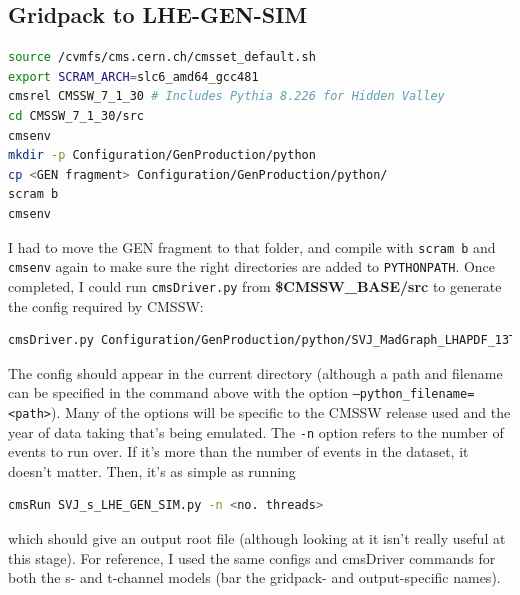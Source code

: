\subsection{Gridpack to LHE-GEN-SIM}

\begin{lstlisting}[belowskip=-0.7cm, language=sh, numbers=none]
source /cvmfs/cms.cern.ch/cmsset_default.sh
export SCRAM_ARCH=slc6_amd64_gcc481
cmsrel CMSSW_7_1_30 # Includes Pythia 8.226 for Hidden Valley
cd CMSSW_7_1_30/src
cmsenv
mkdir -p Configuration/GenProduction/python
cp <GEN fragment> Configuration/GenProduction/python/
scram b
cmsenv
\end{lstlisting}

I had to move the GEN fragment to that folder, and compile with \texttt{scram b} and \texttt{cmsenv} again to make sure the right directories are added to \texttt{PYTHONPATH}. Once completed, I could run \texttt{cmsDriver.py} from \textbf{\$CMSSW\_BASE/src} to generate the config required by CMSSW:

\begin{lstlisting}[belowskip=-0.7cm, language=sh, numbers=none]
cmsDriver.py Configuration/GenProduction/python/SVJ_MadGraph_LHAPDF_13TeV_s_channel_spin1_GEN_frag.py --fileout file:SVJ_s_LHE_GEN_SIM.root --mc --eventcontent RAWSIM,LHE --customise SLHCUpgradeSimulations/Configuration/postLS1Customs.customisePostLS1,Configuration/DataProcessing/Utils.addMonitoring --datatier GEN-SIM,LHE --conditions MCRUN2_71_V1::All --beamspot Realistic50ns13TeVCollision -s LHE,GEN,SIM --magField 38T_PostLS1 --python_filename SVJ_s_LHE_GEN_SIM.py --no_exec -n 250
\end{lstlisting}

The config should appear in the current directory (although a path and filename can be specified in the command above with the option \texttt{--python\_filename=<path>}). Many of the options will be specific to the CMSSW release used and the year of data taking that's being emulated. The \texttt{-n} option refers to the number of events to run over. If it's more than the number of events in the dataset, it doesn't matter. Then, it's as simple as running

\begin{lstlisting}[belowskip=-0.7cm, language=sh, numbers=none]
cmsRun SVJ_s_LHE_GEN_SIM.py -n <no. threads>
\end{lstlisting}

which should give an output root file (although looking at it isn't really useful at this stage). For reference, I used the same configs and cmsDriver commands for both the s- and t-channel models (bar the gridpack- and output-specific names).


